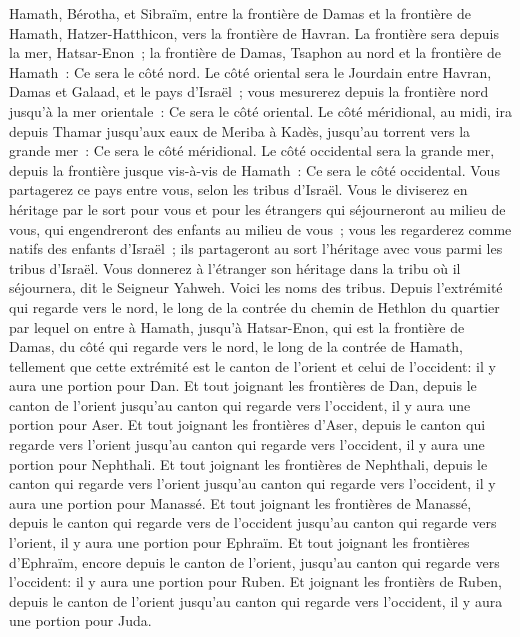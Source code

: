 \begin{multicols}{2}
Hamath, Bérotha, et Sibraïm, entre la frontière de Damas et la frontière de Hamath, Hatzer-Hatthicon, vers la frontière de Havran.
La frontière sera depuis la mer, Hatsar-Enon~; la frontière de Damas, Tsaphon au nord et la frontière de Hamath~: Ce sera le côté nord.
Le côté oriental sera le Jourdain entre Havran, Damas et Galaad, et le pays d'Israël~; vous mesurerez depuis la frontière nord jusqu'à la mer orientale~: Ce sera le côté oriental.
Le côté méridional, au midi, ira depuis Thamar jusqu'aux eaux de Meriba à Kadès, jusqu'au torrent vers la grande mer~: Ce sera le côté méridional.
Le côté occidental sera la grande mer, depuis la frontière jusque vis-à-vis de Hamath~: Ce sera le côté occidental.
Vous partagerez ce pays entre vous, selon les tribus d'Israël.
Vous le diviserez en héritage par le sort pour vous et pour les étrangers qui séjourneront au milieu de vous, qui engendreront des enfants au milieu de vous~; vous les regarderez comme natifs des enfants d'Israël~; ils partageront au sort l'héritage avec vous parmi les tribus d'Israël.
Vous donnerez à l'étranger son héritage dans la tribu où il séjournera, dit le Seigneur Yahweh.
\VerseOne{}Voici les noms des tribus. Depuis l'extrémité qui regarde vers le nord, le long de la contrée du chemin de Hethlon du quartier par lequel on entre à Hamath, jusqu'à Hatsar-Enon, qui est la frontière de Damas, du côté qui regarde vers le nord, le long de la contrée de Hamath, tellement que cette extrémité est le canton de l'orient et celui de l'occident: il y aura une portion pour Dan.
Et tout joignant les frontières de Dan, depuis le canton de l'orient jusqu'au canton qui regarde vers l'occident, il y aura une portion pour Aser.
Et tout joignant les frontières d'Aser, depuis le canton qui regarde vers l'orient jusqu'au canton qui regarde vers l'occident, il y aura une portion pour Nephthali.
Et tout joignant les frontières de Nephthali, depuis le canton qui regarde vers l'orient jusqu'au canton qui regarde vers l'occident, il y aura une portion pour Manassé. 
Et tout joignant les frontières de Manassé, depuis le canton qui regarde vers de l'occident jusqu'au canton qui regarde vers l'orient, il y aura une portion pour Ephraïm. 
Et tout joignant les frontières d'Ephraïm, encore depuis le canton de l'orient, jusqu'au canton qui regarde vers l'occident: il y aura une portion pour Ruben. 
Et joignant les frontièrs de Ruben, depuis le canton de l'orient jusqu'au canton qui regarde vers l'occident, il y aura une portion pour Juda.

\end{multicols}
